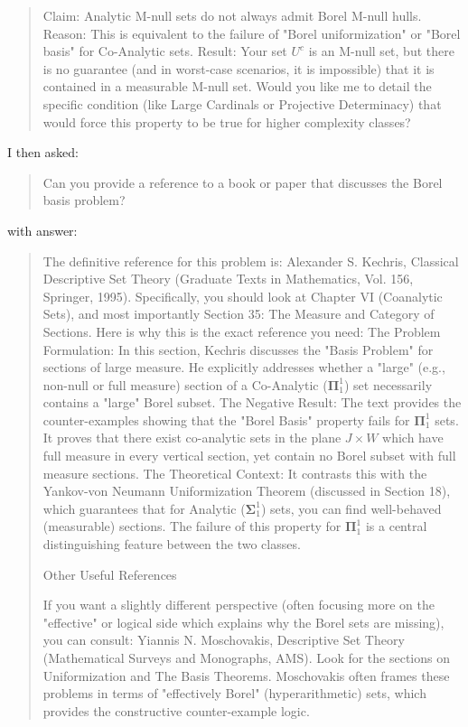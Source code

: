 \begin{Rem}
{\begin{quote}
Claim: Analytic M-null sets do not always admit Borel M-null hulls.
Reason: This is equivalent to the failure of "Borel uniformization" or "Borel basis" for Co-Analytic sets.
Result: Your set $U^c$ is an M-null set, but there is no guarantee (and in worst-case scenarios, it is impossible) that it is contained in a measurable M-null set.
Would you like me to detail the specific condition (like Large Cardinals or Projective Determinacy) that would force this property to be true for higher complexity classes?
    \end{quote}
    I then asked:
    \begin{quote}
      Can you provide a reference to a book or paper that discusses the Borel basis problem?
    \end{quote}
    with answer:
    \begin{quote}
      The definitive reference for this problem is:
Alexander S. Kechris, Classical Descriptive Set Theory (Graduate Texts in Mathematics, Vol. 156, Springer, 1995).
Specifically, you should look at Chapter VI (Coanalytic Sets), and most importantly Section 35: The Measure and Category of Sections.
Here is why this is the exact reference you need:
The Problem Formulation: In this section, Kechris discusses the "Basis Problem" for sections of large measure. He explicitly addresses whether a "large" (e.g., non-null or full measure) section of a Co-Analytic ($\mathbf{\Pi}^1_1$) set necessarily contains a "large" Borel subset.
The Negative Result: The text provides the counter-examples showing that the "Borel Basis" property fails for $\mathbf{\Pi}^1_1$ sets. It proves that there exist co-analytic sets in the plane $J \times W$ which have full measure in every vertical section, yet contain no Borel subset with full measure sections.
The Theoretical Context: It contrasts this with the Yankov-von Neumann Uniformization Theorem (discussed in Section 18), which guarantees that for Analytic ($\mathbf{\Sigma}^1_1$) sets, you can find well-behaved (measurable) sections. The failure of this property for $\mathbf{\Pi}^1_1$ is a central distinguishing feature between the two classes.

Other Useful References

If you want a slightly different perspective (often focusing more on the "effective" or logical side which explains why the Borel sets are missing), you can consult:
Yiannis N. Moschovakis, Descriptive Set Theory (Mathematical Surveys and Monographs, AMS).
Look for the sections on Uniformization and The Basis Theorems. Moschovakis often frames these problems in terms of "effectively Borel" (hyperarithmetic) sets, which provides the constructive counter-example logic.


\end{quote}}
\end{Rem}
